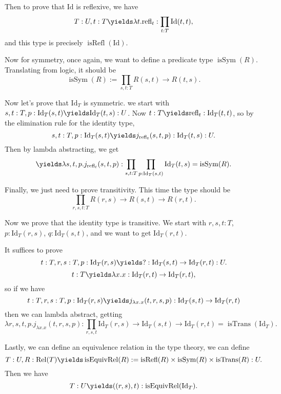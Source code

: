 \documentclass{article}
\newcommand\pred[1]{\operatorname{#1}}
\newcommand\IdT{\mathrm{Id}}
\newcommand\refl{\mathrm{refl}}
\newcommand\Rel{\operatorname{Rel}}
\begin{document}
Then to prove that $\IdT$ is reflexive, we have 
\[T:U,t:T\yields \lambda t.\refl_t:\prod_{t:T}\IdT(t,t), \]
and this type is precisely 
$\pred{isRefl}(\IdT)$.

Now for symmetry, once again, we want to define a predicate type
$\pred{isSym}(R)$.
Translating from logic, it should be 
\[\pred{isSym}(R):=\prod_{s,t:T} R(s,t)\to R(t,s). \]

Now let's prove that $\IdT_T$ is symmetric.
we start with $s,t:T,p:\IdT_T(s,t) \yields \IdT_T(t,s):U$.
Now 
$t:T\yields \refl_t:\IdT_T(t,t)$, so by the elimination rule
for the identity type,
\[ s,t:T,p:\IdT_T(s,t) \yields j_{\refl_t}(s,t,p): \IdT_T(t,s):U.\]
Then by lambda abstracting, we get
\[\yields \lambda s,t,p. j_{\refl_t}(s,t,p) : 
\prod_{s,t:T}\prod_{p:\IdT_T(s,t)}\IdT_T(t,s)
=\pred{isSym}(R).\]

Finally, we just need to prove transitivity.
This time the type should be 
\[\prod_{r,s,t:T} R(r,s)\to R(s,t)\to R(r,t).\]

Now we prove that the identity type is transitive.
We start with $r,s,t:T$, $p:\IdT_T(r,s)$, $q:\IdT_T(s,t)$,
and we want to get $\IdT_T(r,t)$. 

It suffices to prove
\[
    t:T,r,s:T,p:\IdT_T(r,s)
    \yields 
    ?:\IdT_T(s,t)\to \IdT_T(r,t):U.
\]
\[ t:T\yields  \lambda x.x : \IdT_T(r,t) \to \IdT_T(r,t), \]
so if we have %
\[ t:T,r,s:T,p:\IdT_T(r,s)\yields  j_{\lambda x.x}(t,r,s,p) :
\IdT_T(s,t) \to \IdT_T(r,t) \]
then we can lambda abstract, getting 
\[ \lambda r,s,t,p. j_{\lambda x.x}(t,r,s,p) : 
\prod_{r,s,t} \IdT_T(r,s)\to \IdT_T(s,t) \to \IdT_T(r,t)
=\pred{isTrans}(\IdT_T).
\]

Lastly, we can define an equivalence relation in the type theory,
we can define 
\[T:U,R:\Rel(T) \yields \pred{isEquivRel}(R) 
:= \pred{isRefl}(R)\times \pred{isSym}(R)\times \pred{isTrans}(R):U.\]
Then we have 
\[ T:U\yields ((r,s),t) : \pred{isEquivRel}(\IdT_T).
\]
\end{document}
